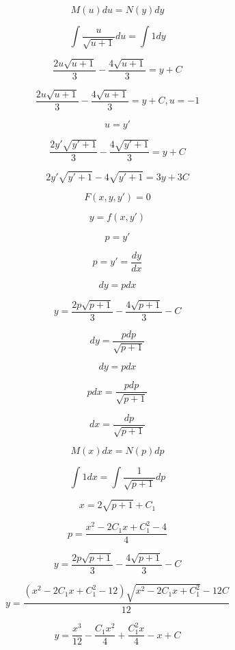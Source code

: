 \documentclass{article}
\begin{document}
$$M(u)du = N(y)dy$$

$$\int \frac{u}{\sqrt{u + 1}}du = \int 1dy$$

$$\frac{2u\sqrt{u + 1}}{3} - \frac{4\sqrt{u + 1}}{3} = y + C$$

$$\frac{2u\sqrt{u + 1}}{3} - \frac{4\sqrt{u + 1}}{3} = y + C, u = -1$$

$$u = y'$$

$$\frac{2y'\sqrt{y' + 1}}{3} - \frac{4\sqrt{y' + 1}}{3} = y + C$$

$$2y'\sqrt{y' + 1} - 4\sqrt{y' + 1} = 3y + 3C$$

$$F(x, y, y') = 0$$

$$y = f(x, y')$$

$$p = y'$$

$$p = y' = \frac{dy}{dx}$$

$$dy = pdx$$

$$y = \frac{2p\sqrt{p + 1}}{3} - \frac{4\sqrt{p + 1}}{3} - C$$

$$dy = \frac{pdp}{\sqrt{p + 1}}$$

$$dy = pdx$$

$$pdx = \frac{pdp}{\sqrt{p + 1}}$$

$$dx = \frac{dp}{\sqrt{p + 1}}$$

$$M(x)dx = N(p)dp$$

$$\int 1 dx = \int \frac{1}{\sqrt{p + 1}}dp$$

$$x = 2 \sqrt{p + 1} + C_1$$

$$p = \frac{x^2 - 2C_1x + C_1^2-4}{4}$$

$$y = \frac{2p\sqrt{p + 1}}{3} - \frac{4\sqrt{p + 1}}{3} - C$$

$$y = \frac{(x^2 - 2C_1x + C_1^2 - 12) \sqrt{x^2 - 2C_1x + C_1^2} - 12C}{12}$$

$$y = \frac{x^3}{12} - \frac{C_1x^2}{4} + \frac{C_1^2x}{4} - x + C$$
\end{document}
